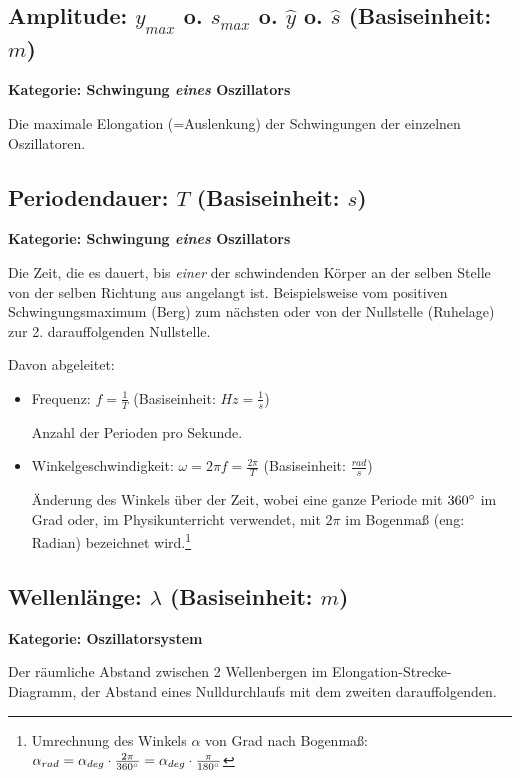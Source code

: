 \subsection[Amplitude]{Amplitude: $y_{max}$ o. $s_{max}$ o. $\hat{y}$ o. $\hat{s}$ (Basiseinheit: $m$)}

\textbf{Kategorie: Schwingung \textit{eines} Oszillators}

\noindent Die maximale Elongation (=\glqq Auslenkung\grqq) der Schwingungen der einzelnen Oszillatoren.



\subsection[Periodendauer]{Periodendauer: $T$ (Basiseinheit: $s$)}

\textbf{Kategorie: Schwingung \textit{eines} Oszillators}
	
\noindent Die Zeit, die es dauert, bis \emph{einer} der schwindenden Körper an der selben Stelle von der selben Richtung aus angelangt ist. Beispielsweise vom positiven Schwingungsmaximum (\glqq Berg\grqq) zum nächsten oder von der Nullstelle (\glqq Ruhelage\grqq) zur 2. darauffolgenden Nullstelle.

Davon abgeleitet:
\begin{itemize}
	\item Frequenz: $f=\frac{1}{T}$ (Basiseinheit: $Hz=\frac{1}{s}$)

	Anzahl der Perioden pro Sekunde.
	\item Winkelgeschwindigkeit: $\omega=2 \pi f=\frac{2 \pi}{T}$ (Basiseinheit: $\frac{rad}{s}$)

	Änderung des Winkels über der Zeit, wobei eine ganze Periode mit $360 \degree$ im Grad oder, im Physikunterricht verwendet, mit $2 \pi$ im Bogenmaß (eng: \glqq Radian\grqq) bezeichnet wird.\footnote{Umrechnung des Winkels $\alpha$ von Grad nach Bogenmaß: $\alpha_{rad} = \alpha_{deg} \cdot \frac{2\pi}{360 \degree} = \alpha_{deg} \cdot \frac{\pi}{180 \degree} $}
\end{itemize}



\subsection[Wellenlänge]{Wellenlänge: $\lambda$ (Basiseinheit: $m$)}

\textbf{Kategorie: Oszillatorsystem}

\noindent Der räumliche Abstand zwischen 2 Wellenbergen im Elongation-Strecke-Diagramm, der Abstand eines Nulldurchlaufs mit dem zweiten darauffolgenden.



